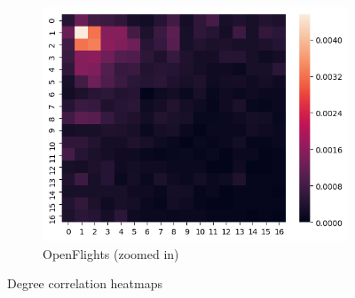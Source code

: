 \begin{figure}[h]
\begin{subfigure}[b]{0.3\textwidth}
    \end{subfigure}
    ~
    \begin{subfigure}[b]{0.3\textwidth}
        \includegraphics[width=\textwidth]{img/heatmap_2}
        \caption*{OpenFlights (zoomed in)}
    \end{subfigure}
    \caption{Degree correlation heatmaps}
\end{figure}

